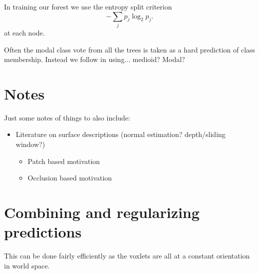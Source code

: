 \documentclass[10pt,twocolumn,letterpaper]{article}
\begin{document}

In training our forest we use the entropy split criterion
\begin{equation}
- \sum_j p_j \log_2 p_j.
\end{equation}
at each node.

Often the modal class vote from all the trees is taken as a hard prediction of class membership. Instead we follow \cite{} in using... medioid? Modal?






\section{Notes}
Just some notes of things to also include:

\begin{itemize}
\item Literature on surface descriptions (normal estimation? depth/sliding window?)
\begin{itemize}
\item Patch based motivation
\item Occlusion based motivation
\end{itemize}
\end{itemize}



\section{Combining and regularizing predictions}

This can be done fairly efficiently as the voxlets are all at a constant orientation in world space.
\end{document}

